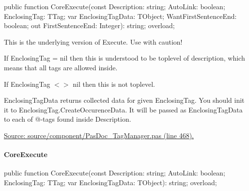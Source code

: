 \documentclass{report}
\newif\ifpdf
\begin{document}
\label{PasDoc_TagManager.TTagManager-CoreExecute}
\begin{list}{}{
\setlength{\itemindent}{0cm}
\setlength{\listparindent}{0cm}
\setlength{\leftmargin}{\evensidemargin}
\addtolength{\leftmargin}{\tmplength}
\settowidth{\labelsep}{X}
\addtolength{\leftmargin}{\labelsep}
\setlength{\labelwidth}{\tmplength}
}
\item[\textbf{Declaration}\hfill]
\ifpdf
\begin{flushleft}
\fi
\begin{ttfamily}
public function CoreExecute(const Description: string; AutoLink: boolean; EnclosingTag: TTag; var EnclosingTagData: TObject; WantFirstSentenceEnd: boolean; out FirstSentenceEnd: Integer): string; overload;\end{ttfamily}

\ifpdf
\end{flushleft}
\fi

\par
\item[\textbf{Description}]
This is the underlying version of Execute. Use with caution!

If EnclosingTag = nil then this is understood to be toplevel of description, which means that all tags are allowed inside.

If EnclosingTag {$<$}{$>$} nil then this is not toplevel.

EnclosingTagData returns collected data for given EnclosingTag. You should init it to EnclosingTag.CreateOccurenceData. It will be passed as EnclosingTagData to each of @{-}tags found inside Description.\par
\href{https://github.com/pasdoc/pasdoc/blob/master/source/component/PasDoc_TagManager.pas#L468}{Source: source/component/PasDoc{\_}TagManager.pas (line 468).}

\end{list}
\paragraph*{CoreExecute}\hspace*{\fill}

\label{PasDoc_TagManager.TTagManager-CoreExecute}
\begin{list}{}{
\setlength{\itemindent}{0cm}
\setlength{\listparindent}{0cm}
\setlength{\leftmargin}{\evensidemargin}
\addtolength{\leftmargin}{\tmplength}
\settowidth{\labelsep}{X}
\addtolength{\leftmargin}{\labelsep}
\setlength{\labelwidth}{\tmplength}
}
\item[\textbf{Declaration}\hfill]
\ifpdf
\begin{flushleft}
\fi
\begin{ttfamily}
public function CoreExecute(const Description: string; AutoLink: boolean; EnclosingTag: TTag; var EnclosingTagData: TObject): string; overload;\end{ttfamily}

\ifpdf
\end{flushleft}
\fi

\end{list}
\end{document}

